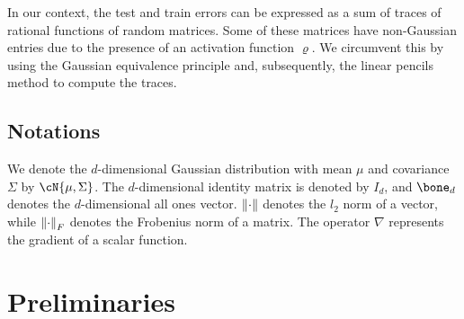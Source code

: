
In our context, the test and train errors can be expressed as a sum of traces of rational functions of random matrices. Some of these matrices have non-Gaussian entries due to the presence of an activation function $\varrho$. We circumvent this by using the Gaussian equivalence principle and, subsequently, the linear pencils method to compute the traces.
 
\subsection{Notations}
We denote the $d$-dimensional Gaussian distribution with mean $\mu$ and covariance $\Sigma$ by $\cN{\mu,\Sigma}$. The $d$-dimensional identity matrix is denoted by $I_d$, and $\bone_d$ denotes the $d$-dimensional all ones vector. $\norm{\cdot}$ denotes the $l_2$ norm of a vector, while $\norm{\cdot}_F$ denotes the Frobenius norm of a matrix. The operator $\nabla$ represents the gradient of a scalar function. 
\section{Preliminaries}

